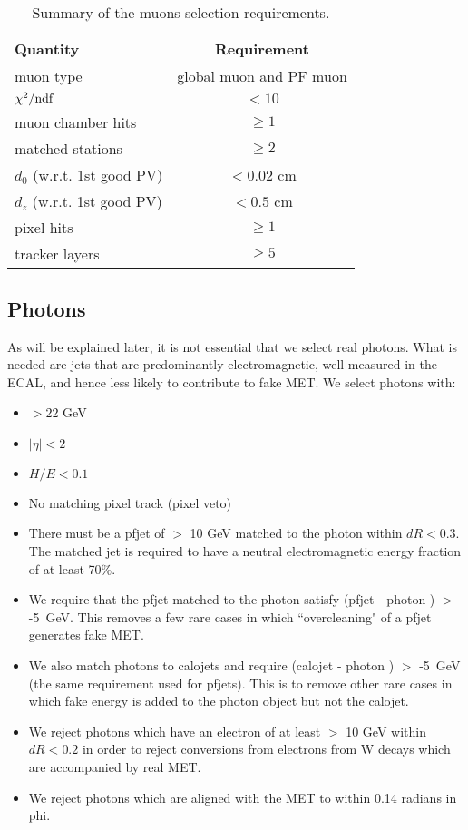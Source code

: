 \begin{table}[htb]
\begin{center}
\caption{\label{table:muons} Summary of the muons selection requirements.}
\begin{tabular}{l|c}
\hline
              Quantity   &     Requirement \\
\hline
muon type & global muon and PF muon \\
$\chi^2/\rm{ndf}$ & $<10$   \\
muon chamber hits & $\geq1$ \\
matched stations  & $\geq2$ \\
$d_{0}$ (w.r.t. 1st good PV)            & $<0.02$ cm  \\
$d_{z}$ (w.r.t. 1st good PV)            & $<0.5$ cm   \\
pixel hits & $\geq1$ \\
tracker layers & $\geq5$ \\
\hline
\end{tabular}
\end{center}
\end{table}

\subsection{Photons}
\label{sec:phosel}

As will be explained later, it is not essential that we select real photons. 
What is needed are jets that are predominantly electromagnetic, well measured in the ECAL, and hence less likely to contribute to fake MET. We select photons with:

\begin{itemize}
\item \pt $ > 22$ GeV
\item $|\eta| < 2$
\item $H/E < 0.1$
\item No matching pixel track (pixel veto)
\item There must be a pfjet of \pt $ >$ 10 GeV matched to the photon within $dR < 0.3$. 
The matched jet is required to have a neutral electromagnetic energy fraction of at least 70\%.
\item 
  We require that the pfjet \pt matched to the photon satisfy
  (pfjet \pt - photon \pt) $>$ -5~GeV.
  This removes a few rare cases in which ``overcleaning" of a
  pfjet
  generates fake MET.

\item We also match photons to calojets and require (calojet \pt - photon \pt) $>$ -5~GeV
  (the same requirement used for pfjets). This is to remove other rare cases in which fake
  energy is added to the photon object but not the calojet.

\item We reject photons which have an electron of at least \pt $>$ 10 GeV 
  within $dR < 0.2$
  in order to reject
  conversions from electrons from W decays which are accompanied by real MET.

\item We reject photons which are aligned with the MET to within 0.14 radians in phi.

\end{itemize}

